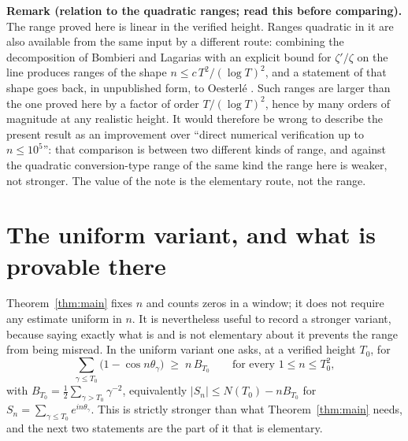 \documentclass[11pt]{article}
\theoremstyle{remark}
\begin{document}
\medskip
\noindent\textbf{Remark (relation to the quadratic ranges; read this before comparing).}
The range proved here is linear in the verified height. Ranges quadratic in it are also
available from the same input by a different route: combining the decomposition of
Bombieri and Lagarias \cite{BombieriLagarias} with an explicit bound for $\zeta'/\zeta$ on the
line produces ranges of the shape $n\le c\,T^{2}/(\log T)^{2}$, and a statement of that shape
goes back, in unpublished form, to Oesterl\'e \cite{Voros}. Such ranges are larger than the one
proved here by a factor of order $T/(\log T)^{2}$, hence by many orders of magnitude at any
realistic height. It would therefore be wrong to describe the present result as an improvement
over ``direct numerical verification up to $n\le10^{5}$'': that comparison is between two
different kinds of range, and against the quadratic conversion-type range of the same kind the
range here is weaker, not stronger. The value of the note is the elementary route, not the range.

\appendix

\section{The uniform variant, and what is provable there}
\label{app:uniform}

Theorem~\ref{thm:main} fixes $n$ and counts zeros in a window; it does not require any estimate
uniform in $n$. It is nevertheless useful to record a stronger variant, because saying exactly
what is and is not elementary about it prevents the range from being misread. In the uniform
variant one asks, at a verified height $T_0$, for
\begin{equation}\label{eq:uniform}
  \sum_{\gamma\le T_0}\bigl(1-\cos n\theta_\gamma\bigr)\;\ge\;n\,B_{T_0}
  \qquad\text{for every }1\le n\le T_0^{2},
\end{equation}
with $B_{T_0}=\frac12\sum_{\gamma>T_0}\gamma^{-2}$, equivalently $|S_n|\le N(T_0)-nB_{T_0}$ for
$S_n=\sum_{\gamma\le T_0}e^{in\theta_\gamma}$. This is strictly stronger than what
Theorem~\ref{thm:main} needs, and the next two statements are the part of it that is elementary.
\end{document}
